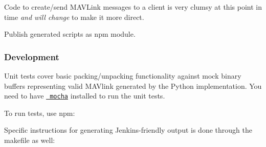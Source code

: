 Code to create/send M\+A\+V\+Link messages to a client is very clumsy at this point in time {\itshape and will change} to make it more direct.

Publish generated scripts as npm module.

\subsubsection*{Development}

Unit tests cover basic packing/unpacking functionality against mock binary buffers representing valid M\+A\+Vlink generated by the Python implementation. You need to have \href{http://visionmedia.github.com/mocha/}{\texttt{ mocha}} installed to run the unit tests.

To run tests, use npm\+:


\begin{DoxyCode}{0}
\end{DoxyCode}


Specific instructions for generating Jenkins-\/friendly output is done through the makefile as well\+:


\begin{DoxyCode}{0}
\end{DoxyCode}
 